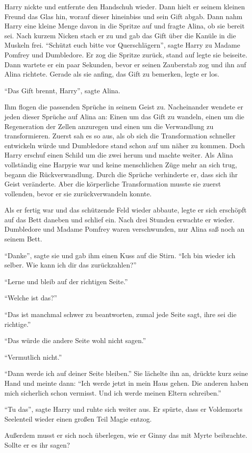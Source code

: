Harry nickte und entfernte den Handschuh wieder. Dann hielt er seinem kleinen Freund das Glas hin, worauf dieser hineinbiss und sein Gift abgab. Dann nahm Harry eine kleine Menge davon in die Spritze auf und fragte Alina, ob sie bereit sei. Nach kurzem Nicken stach er zu und gab das Gift über die Kanüle in die Muskeln frei. \enquote{Schützt euch bitte vor Querschlägern}, sagte Harry zu Madame Pomfrey und Dumbledore. Er zog die Spritze zurück, stand auf legte sie beiseite. Dann wartete er ein paar Sekunden, bevor er seinen Zauberstab zog und ihn auf Alina richtete. Gerade als sie anfing, das Gift zu bemerken, legte er los.

\enquote{Das Gift brennt, Harry}, sagte Alina.

Ihm flogen die passenden Sprüche in seinem Geist zu. Nacheinander wendete er jeden dieser Sprüche auf Alina an: Einen um das Gift zu wandeln, einen um die Regeneration der Zellen anzuregen und einen um die Verwandlung zu transformieren. Zuerst sah es so aus, als ob sich die Transformation schneller entwickeln würde und Dumbledore stand schon auf um näher zu kommen. Doch Harry erschuf einen Schild um die zwei herum und machte weiter. Als Alina vollständig eine Harpyie war und keine menschlichen Züge mehr an sich trug, begann die Rückverwandlung. Durch die Sprüche verhinderte er, dass sich ihr Geist veränderte. Aber die körperliche Transformation musste sie zuerst vollenden, bevor er sie zurückverwandeln konnte.

Als er fertig war und das schützende Feld wieder abbaute, legte er sich erschöpft auf das Bett daneben und schlief ein. Nach drei Stunden erwachte er wieder. Dumbledore und Madame Pomfrey waren verschwunden, nur Alina saß noch an seinem Bett.

\enquote{Danke}, sagte sie und gab ihm einen Kuss auf die Stirn. \enquote{Ich bin wieder ich selber. Wie kann ich dir das zurückzahlen?}

\enquote{Lerne und bleib auf der richtigen Seite.}

\enquote{Welche ist das?}

\enquote{Das ist manchmal schwer zu beantworten, zumal jede Seite sagt, ihre sei die richtige.}

\enquote{Das würde die andere Seite wohl nicht sagen.}

\enquote{Vermutlich nicht.}

\enquote{Dann werde ich auf deiner Seite bleiben.} Sie lächelte ihn an, drückte kurz seine Hand und meinte dann: \enquote{Ich werde jetzt in mein Haus gehen. Die anderen haben mich sicherlich schon vermisst. Und ich werde meinen Eltern schreiben.}

\enquote{Tu das}, sagte Harry und ruhte sich weiter aus. Er spürte, dass er Voldemorts Seelenteil wieder einen großen Teil Magie entzog.

Außerdem musst er sich noch überlegen, wie er Ginny das mit Myrte beibrachte. Sollte er es ihr sagen?
